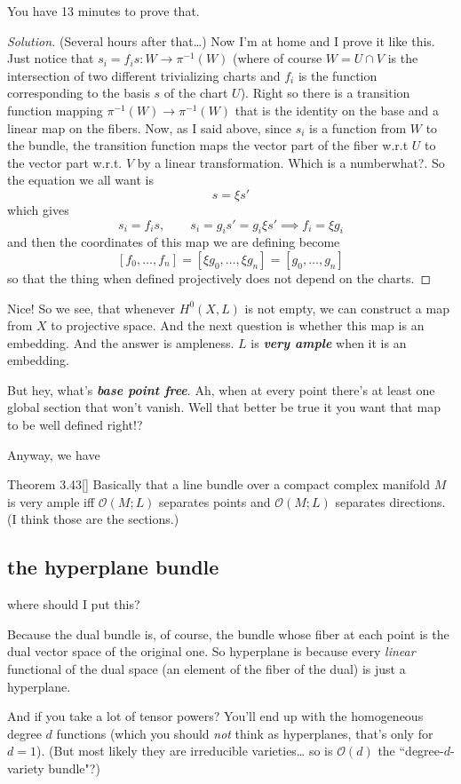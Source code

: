 \begin{exercise}\leavevmode
You have 13 minutes to prove that.
\end{exercise}
\begin{proof}[Solution]\leavevmode
 (Several hours after that…) Now I'm at home and I prove it like this. Just notice that \(s_i=f_is:W \to \pi^{-1}(W)\) (where of course \(W=U \cap V\) is the intersection of two different trivializing charts and \(f_i\) is the function corresponding to the basis \(s\) of the chart \(U\)). Right so there is a transition function mapping \(\pi^{-1}(W) \to \pi^{-1}(W)\) that is the identity on the base and a linear map on the fibers. Now, as I said above, since \(s_i\) is a function from \(W\) to the bundle, the transition function maps the vector part of the fiber w.r.t \(U\) to the vector part w.r.t. \(V\) by a linear transformation. Which is a number{\color{2}what?}. So the equation we all want is
\[s=\xi s'\]
which gives
\[s_i=f_is,\qquad s_i=g_is'=g_i\xi s' \implies f_i=\xi g_i\]
and then the coordinates of this map we are defining become
\[[f_0,\ldots,f_n]=[\xi g_0,\ldots,\xi g_n]=[g_0,\ldots,g_n]\]
so that the thing when defined projectively does not depend on the charts.
\end{proof}

Nice! So we see, that whenever \(H^{0}(X,L)\) is not empty, we can construct a map from \(X\) to projective space. And the next question is whether this map is an embedding. And the answer is ampleness. \(L\) is \textit{\textbf{very  ample}} when it is an embedding.

But hey, what's \textit{\textbf{base point free}}. Ah, when at every point there's at least one global section that won't vanish. Well that better be true it you want that map to be well defined right!?

Anyway, we have
\begin{thing4}{Theorem 3.43}[\cite{lec}]\label{thm:3.43}\leavevmode
Basically that a line bundle over a compact complex manifold \(M\) is very ample iff \(\mathcal{O}(M;L)\) separates points and \(\mathcal{O}(M;L)\) separates directions. (I think those are the sections.)
\end{thing4}

\subsection*{the hyperplane bundle}
where should I put this?
\begin{upshot}\leavevmode
Because the dual bundle is, of course, the bundle whose fiber at each point is the dual vector space of the original one. So hyperplane is because every \textit{linear}  functional of the dual space (an element of the fiber of the dual) is just a hyperplane.

And if you take a lot of tensor powers? You'll end up with the homogeneous degree \(d\) functions (which you should \textit{not} think as hyperplanes, that's only for \(d=1\)). (But most likely they are irreducible varieties… so is \(\mathcal{O}(d)\) the ``degree-\(d\)-variety bundle"?)
\end{upshot}

